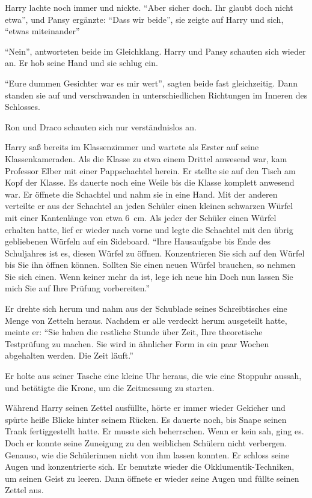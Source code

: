 Harry lachte noch immer und nickte. \enquote{Aber sicher doch. Ihr glaubt doch nicht etwa\abs}, und Pansy ergänzte: \enquote{Dass wir beide\abs}, sie zeigte auf Harry und sich, \enquote{etwas miteinander\abs}

\enquote{Nein}, antworteten beide im Gleichklang. Harry und Pansy schauten sich wieder an. Er hob seine Hand und sie schlug ein.

\enquote{Eure dummen Gesichter war es mir wert}, sagten beide fast gleichzeitig. Dann standen sie auf und verschwanden in unterschiedlichen Richtungen im Inneren des Schlosses.

Ron und Draco schauten sich nur verständnislos an.

\trenn

Harry saß bereits im Klassenzimmer und wartete als Erster auf seine Klassenkameraden. Als die Klasse zu etwa einem Drittel anwesend war, kam Professor Elber mit einer Pappschachtel herein. Er stellte sie auf den Tisch am Kopf der Klasse. Es dauerte noch eine Weile bis die Klasse komplett anwesend war. Er öffnete die Schachtel und nahm sie in eine Hand. Mit der anderen verteilte er aus der Schachtel an jeden Schüler einen kleinen schwarzen Würfel mit einer Kantenlänge von etwa 6~cm. Als jeder der Schüler einen Würfel erhalten hatte, lief er wieder nach vorne und legte die Schachtel mit den übrig gebliebenen Würfeln auf ein Sideboard. \enquote{Ihre Hausaufgabe bis Ende des Schuljahres ist es, diesen Würfel zu öffnen. Konzentrieren Sie sich auf den Würfel bis Sie ihn öffnen können. Sollten Sie einen neuen Würfel brauchen, so nehmen Sie sich einen. Wenn keiner mehr da ist, lege ich neue hin \gst Doch nun lassen Sie mich Sie auf Ihre Prüfung vorbereiten.}

Er drehte sich herum und nahm aus der Schublade seines Schreibtisches eine Menge von Zetteln heraus. Nachdem er alle verdeckt herum ausgeteilt hatte, meinte er: \enquote{Sie haben die restliche Stunde über Zeit, Ihre theoretische Testprüfung zu machen. Sie wird in ähnlicher Form in ein paar Wochen abgehalten werden. \gst Die Zeit läuft.}

Er holte aus seiner Tasche eine kleine Uhr heraus, die wie eine Stoppuhr aussah, und betätigte die Krone, um die Zeitmessung zu starten.

Während Harry seinen Zettel ausfüllte, hörte er immer wieder Gekicher und spürte heiße Blicke hinter seinem Rücken. Es dauerte noch, bis Snape seinen Trank fertiggestellt hatte. Er musste sich beherrschen. Wenn er kein  sah, ging es. Doch er konnte seine Zuneigung zu den weiblichen Schülern nicht verbergen. Genauso, wie die Schülerinnen nicht von ihm lassen konnten. Er schloss seine Augen und konzentrierte sich. Er benutzte wieder die Okklumentik-Techniken, um seinen Geist zu leeren. Dann öffnete er wieder seine Augen und füllte seinen Zettel aus.

